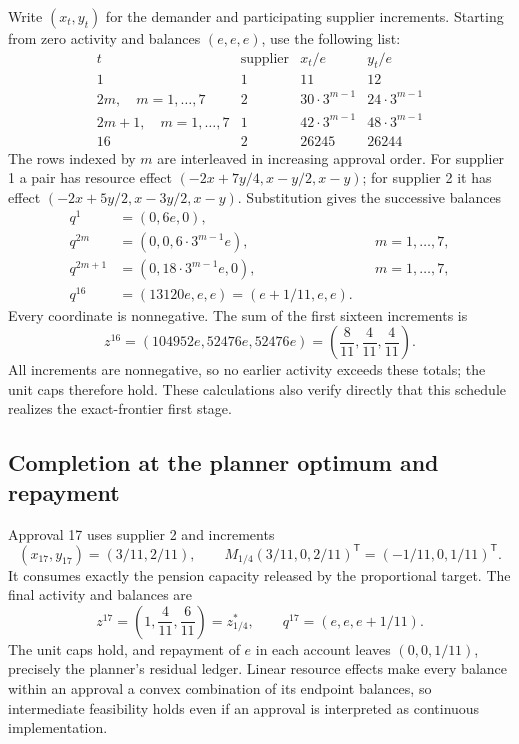 \documentclass[ecta,draft,supplement]{econsocart}
\theoremstyle{definition}
\theoremstyle{definition}
\begin{document}
\begin{appendix}
Write $(x_t,y_t)$ for the demander and participating supplier increments.
Starting from zero activity and balances $(e,e,e)$, use the following list:
\[
\begin{array}{c|c|c|c}
 t & \text{supplier} & x_t/e & y_t/e\\ \hline
 1 & 1 & 11 & 12\\
 2m,\quad m=1,\ldots,7 & 2 & 30\cdot3^{m-1} &24\cdot3^{m-1}\\
 2m+1,\quad m=1,\ldots,7 &1&42\cdot3^{m-1}&48\cdot3^{m-1}\\
 16&2&26245&26244
\end{array}
\]
The rows indexed by $m$ are interleaved in increasing approval order.
For supplier 1 a pair has resource effect
$(-2x+7y/4,x-y/2,x-y)$; for supplier 2 it has effect
$(-2x+5y/2,x-3y/2,x-y)$. Substitution gives the successive balances
\[
\begin{aligned}
 q^1&=(0,6e,0),\\
 q^{2m}&=(0,0,6\cdot3^{m-1}e), &&m=1,\ldots,7,\\
 q^{2m+1}&=(0,18\cdot3^{m-1}e,0), &&m=1,\ldots,7,\\
 q^{16}&=(13120e,e,e)=(e+1/11,e,e).
\end{aligned}
\]
Every coordinate is nonnegative. The sum of the first sixteen increments is
\[
 z^{16}=(104952e,52476e,52476e)
       =\left(\frac8{11},\frac4{11},\frac4{11}\right).
\]
All increments are nonnegative, so no earlier activity exceeds these totals;
the unit caps therefore hold. These calculations also verify directly that
this schedule realizes the exact-frontier first stage.

\subsection{Completion at the planner optimum and repayment}

Approval 17 uses supplier 2 and increments
\[
 (x_{17},y_{17})=(3/11,2/11),\qquad
 M_{1/4}(3/11,0,2/11)^{\mathsf T}=(-1/11,0,1/11)^{\mathsf T}.
\]
It consumes exactly the pension capacity released by the proportional target.
The final activity and balances are
\[
 z^{17}=\left(1,\frac4{11},\frac6{11}\right)=z_{1/4}^*,
 \qquad q^{17}=(e,e,e+1/11).
\]
The unit caps hold, and repayment of $e$ in each account leaves
$(0,0,1/11)$, precisely the planner's residual ledger. Linear resource
effects make every balance within an approval a convex combination of its
endpoint balances, so intermediate feasibility holds even if an approval is
interpreted as continuous implementation.


\end{appendix}
\end{document}
